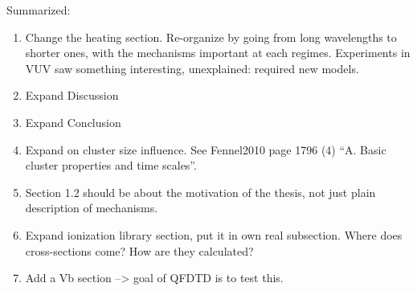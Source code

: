 Summarized:
\begin{enumerate}
\item Change the heating section. Re-organize by going from long wavelengths to
      shorter ones, with the mechanisms important at each regimes. Experiments
      in VUV saw something interesting, unexplained: required new models.
\item Expand Discussion
\item Expand Conclusion
\item Expand on cluster size influence. See Fennel2010\cite{Fennel2010} page 1796 (4)
      ``A. Basic cluster properties and time scales''.
\item Section 1.2 should be about the motivation of the thesis, not just plain
      description of mechanisms.
\item Expand ionization library section, put it in own real subsection. Where
      does cross-sections come? How are they calculated?
\item Add a Vb section --> goal of QFDTD is to test this.
\end{enumerate}


\newpage
{}
\listoffixmes
